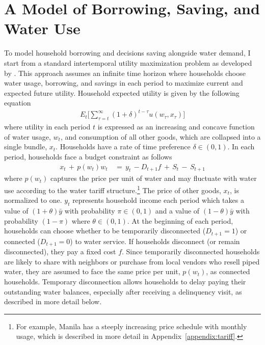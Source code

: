 \documentclass[12pt]{article}
\begin{document}
\section{A Model of Borrowing, Saving, and Water Use}\label{section:model}



To model household borrowing and decisions saving alongside water demand, I start from a standard intertemporal utility maximization problem as developed by \cite{deaton1991saving}.  This approach assumes an infinite time horizon where households choose water usage, borrowing, and savings in each period to maximize current and expected future utility.  Household expected utility is given by the following equation
\begin{align}\label{eq:u}
E_t \Big[ \sum_{\tau = t}^{\infty} (1+\delta)^{t-\tau} u(w_{\tau},x_{\tau})   \Big]
\end{align}
where utility in each period $t$ is expressed as an increasing and concave function of water usage, $w_{t}$, and consumption of all other goods, which are collapsed into a single bundle, $x_{t}$.  Households have a rate of time preference $\delta \in (0,1)$.  In each period, households face a budget constraint as follows
\begin{align}\label{eq:bc}
x_t \, + \, p(w_t) w_t \, &= \, y_t \, - D_{t+1} f  \, + \, S_t \, - \, S_{t+1}
\end{align}
where $p(w_t)$ captures the price per unit of water and may fluctuate with water use according to the water tariff structure.\footnote{For example, Manila has a steeply increasing price schedule with monthly usage, which is described in more detail in Appendix~\ref{appendix:tariff}.}  The price of other goods, $x_t$, is normalized to one.  $y_t$ represents household income each period which takes a value of $(1+\theta)\bar{y}$ with probability $\pi \in (0,1)$ and a value of $(1-\theta)\bar{y}$ with probability $(1-\pi)$ where $\theta  \in (0,1)$.  At the beginning of each period, households can choose whether to be temporarily disconnected ($D_{t+1}=1$) or connected ($D_{t+1}=0$) to water service.  If households disconnect (or remain disconnected), they pay a fixed cost $f$.  Since temporarily disconnected households are likely to share with neighbors or purchase from local vendors who resell piped water, they are assumed to face the same price per unit, $p(w_t)$, as connected households.  Temporary disconnection allows households to delay paying their outstanding water balances, especially after receiving a delinquency visit, as described in more detail below.  
\end{document}
